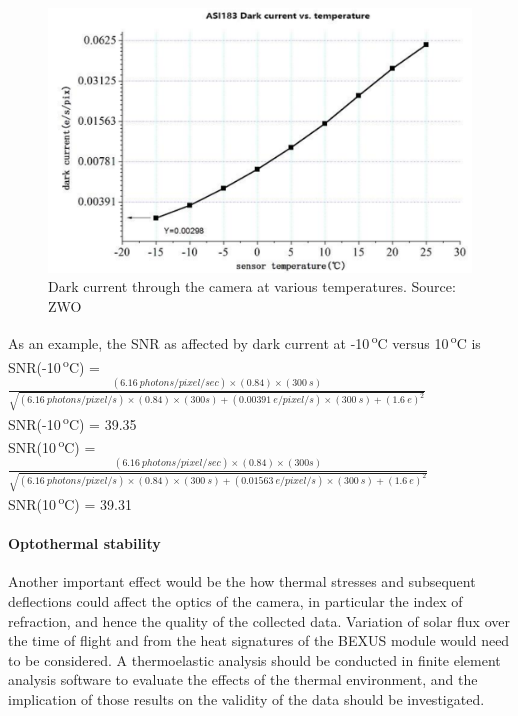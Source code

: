 	\begin{figure}[H]
    \centering
    \includegraphics[scale=0.8]{4-experiment-design/img/mechanical/darkcurrent.png}
    	\caption{Dark current through the camera at various temperatures. Source: ZWO}
	\label{fig:darkcurrent}
	\end{figure}

As an example, the SNR as affected by dark current at -10\,\textsuperscript{o}C versus 10\,\textsuperscript{o}C is\\

 SNR(-10\,\textsuperscript{o}C) =  $\frac{(\SI{6.16}{photons \per pixel \per sec})\times (0.84)\times (\SI{300}{s})}{\sqrt{(\SI{6.16}{photons \per pixel \per s})\times (0.84)\times (300s)+(\SI{0.00391}{e \per pixel \per s})\times (\SI{300}{s})+(\SI{1.6}{e})^2}}$ \\

 SNR(-10\,\textsuperscript{o}C) = 39.35\\

 SNR(10\,\textsuperscript{o}C) =  $\frac{(\SI{6.16}{photons \per pixel \per sec})\times (0.84)\times (300s)}{\sqrt{(\SI{6.16}{photons \per pixel \per s})\times (0.84)\times (\SI{300}{s})+(\SI{0.01563}{e \per pixel \per s})\times (\SI{300}{s})+(\SI{1.6}{e})^2}}$ \\

 SNR(10\,\textsuperscript{o}C) = 39.31\\


\paragraph{Optothermal stability}
Another important effect would be the how thermal stresses and subsequent deflections could affect the optics of the camera, in particular the index of refraction, and hence the quality of the collected data. Variation of solar flux over the time of flight and from the heat signatures of the BEXUS module would need to be considered. A thermoelastic analysis should be conducted in finite element analysis software to evaluate the effects of the thermal environment, and the implication of those results on the validity of the data should be investigated. \

